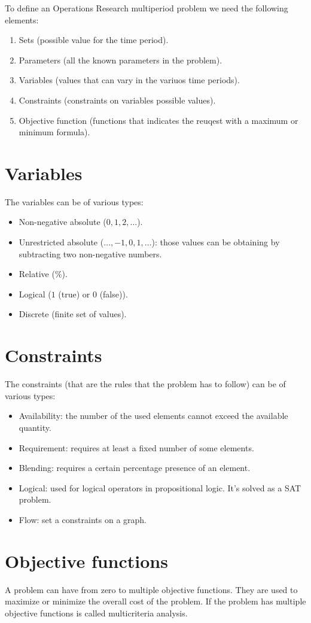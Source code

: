 \documentclass[12pt, a4paper]{report}
\theoremstyle{remark}
\begin{document}
To define an Operations Research multiperiod problem we need the following elements:
\begin{enumerate}
    \item Sets (possible value for the time period).
    \item Parameters (all the known parameters in the problem).
    \item Variables (values that can vary in the variuos time periods).
    \item Constraints (constraints on variables possible values).
    \item Objective function (functions that indicates the reuqest with a maximum or minimum formula).
\end{enumerate}
\section{Variables}
The variables can be of various types: 
\begin{itemize}
    \item Non-negative absolute ($0,1,2,\dots$).
    \item Unrestricted absolute ($\dots,-1,0,1,\dots$): those values can be obtaining by subtracting two non-negative numbers.
    \item Relative ($\%$).
    \item Logical ($1$ (true) or $0$ (false)).
    \item Discrete (finite set of values).
\end{itemize}
\section{Constraints}
The constraints (that are the rules that the problem has to follow) can be of various types: 
\begin{itemize}
    \item Availability: the number of the used elements cannot exceed the available quantity.
    \item Requirement: requires at least a fixed number of some elements.
    \item Blending: requires a certain percentage presence of an element.
    \item Logical: used for logical operators in propositional logic. It's solved as a SAT problem.
    \item Flow: set a constraints on a graph.
\end{itemize}
\section{Objective functions}
A problem can have from zero to multiple objective functions. They are used to maximize or minimize the overall cost of the problem.
If the problem has multiple objective functions is called multicriteria analysis. 
\end{document}
